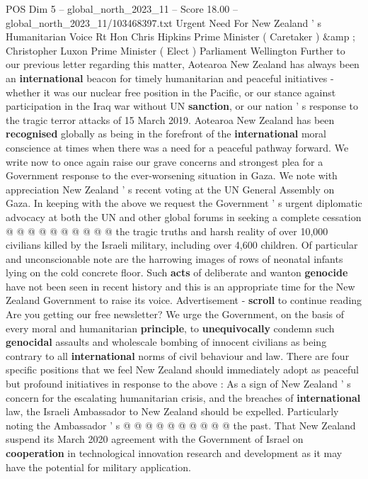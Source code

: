 \begin{textsample}{POS Dim 5 – global\_north\_2023\_11 – Score 18.00 – global\_north\_2023\_11/103468397.txt}  \label{ex:f5_pos_411}
Urgent Need For New Zealand ' s Humanitarian Voice Rt Hon Chris Hipkins Prime Minister ( Caretaker ) \&amp ; Christopher Luxon Prime Minister ( Elect ) Parliament Wellington Further to our previous letter regarding this matter, Aotearoa New Zealand has always been an \textbf{international} beacon for timely humanitarian and peaceful initiatives - whether it was our nuclear free position in the Pacific, or our stance against participation in the Iraq war without UN \textbf{sanction}, or our nation ' s response to the tragic terror attacks of 15 March 2019.
Aotearoa New Zealand has been \textbf{recognised} globally as being in the forefront of the \textbf{international} moral conscience at times when there was a need for a peaceful pathway forward.
We write now to once again raise our grave concerns and strongest plea for a Government response to the ever-worsening situation in Gaza.
We note with appreciation New Zealand ' s recent voting at the UN General Assembly on Gaza.
In keeping with the above we request the Government ' s urgent diplomatic advocacy at both the UN and other global forums in seeking a complete cessation @ @ @ @ @ @ @ @ @ @ the tragic truths and harsh reality of over 10,000 civilians killed by the Israeli military, including over 4,600 children.
Of particular and unconscionable note are the harrowing images of rows of neonatal infants lying on the cold concrete floor.
Such \textbf{acts} of deliberate and wanton \textbf{genocide} have not been seen in recent history and this is an appropriate time for the New Zealand Government to raise its voice.
Advertisement - \textbf{scroll} to continue reading Are you getting our free newsletter?
We urge the Government, on the basis of every moral and humanitarian \textbf{principle}, to \textbf{unequivocally} condemn such \textbf{genocidal} assaults and wholescale bombing of innocent civilians as being contrary to all \textbf{international} norms of civil behaviour and law.
There are four specific positions that we feel New Zealand should immediately adopt as peaceful but profound initiatives in response to the above : As a sign of New Zealand ' s concern for the escalating humanitarian crisis, and the breaches of \textbf{international} law, the Israeli Ambassador to New Zealand should be expelled.
Particularly noting the Ambassador ' s @ @ @ @ @ @ @ @ @ @ the past.
That New Zealand suspend its March 2020 agreement with the Government of Israel on \textbf{cooperation} in technological innovation research and development as it may have the potential for military application.

\end{textsample}
